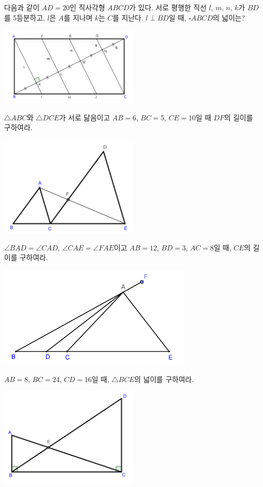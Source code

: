 \documentclass{article}
\newcommand{\bp}[1]
{\begin{mdframed}
[frametitle={#1},skipabove=10pt,skipbelow=10pt]}
\newcommand{\ep}{\end{mdframed}}
\begin{document}
\bp{812}
다음과 같이 \(AD=20\)인 직사각형 \(ABCD\)가 있다.
서로 평행한 직선 \(l\), \(m\), \(n\), \(k\)가 \(BD\)를 5등분하고, \(l\)은 \(A\)를 지나며 \(k\)는 \(C\)를 지난다.
\(l\perp BD\)일 때, \(\square ABCD\)의 넓이는?
\par\includegraphics[width=0.5\textwidth]{SSEN_0812}
\ep

\bp{814}
\(\triangle ABC\)와 \(\triangle DCE\)가 서로 닮음이고 \(AB=6\), \(BC=5\), \(CE=10\)일 때 \(DF\)의 길이를 구하여라.
\par\includegraphics[width=0.5\textwidth]{SSEN_0814}
\ep

\bp{878}
\(\angle BAD=\angle CAD\), \(\angle CAE=\angle FAE\)이고 \(AB=12\), \(BD=3\), \(AC=8\)일 때, \(CE\)의 길이를 구하여라.
\par\includegraphics[width=0.7\textwidth]{SSEN_0878}
\ep

\bp{932}
\(AB=8\), \(BC=24\), \(CD=16\)일 때, \(\triangle BCE\)의 넓이를 구하여라.
\par\includegraphics[width=0.5\textwidth]{SSEN_0932}
\ep
\end{document}
